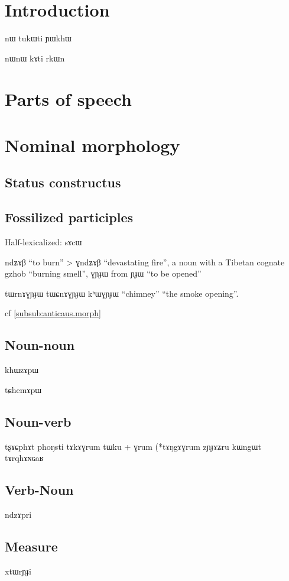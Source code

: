 \documentclass[oldfontcommands,oneside,a4paper,11pt]{memoir}
\newcommand{\ipa}[1]{{\phon #1}} %
\begin{document}
\linenumbers

\chapter{Introduction}


nɯ tukɯti ɲɯkhɯ

nɯnɯ kɤti rkɯn
\chapter{Parts of speech}
\chapter{Nominal morphology}
\section{Status constructus}

\section{Fossilized participles} \label{sec:fossil.participle}
Half-lexicalized: sɤcɯ


 \ipa{ndʑɤβ} ``to burn'' 
> \ipa{ɣndʑɤβ} ``devastating fire'', a noun with a Tibetan cognate \ipa{gzhob} ``burning smell'', 
ɣɲɟɯ from \ipa{ɲɟɯ} ``to be opened''

tɯrnɤɣɲɟɯ
tɯɕnɤɣɲɟɯ
\ipa{kʰɯɣɲɟɯ} ``chimney''   ``the smoke opening''.

cf \ref{subsub:anticaus.morph}

\section{Noun-noun}
khɯzɤpɯ

tɕhemɤpɯ
\section{Noun-verb}
tʂɤɕphɤt
phoŋsti
tɤkɤɣrum tɯku + ɣrum (*tɤŋgɤɣrum
zɲɟɤʑru
kɯngɯt tɤrqhɤɴɢaʁ 



\section{Verb-Noun}


ndzɤpri


\section{Measure}
xtɯrɲɟi
\end{document}
